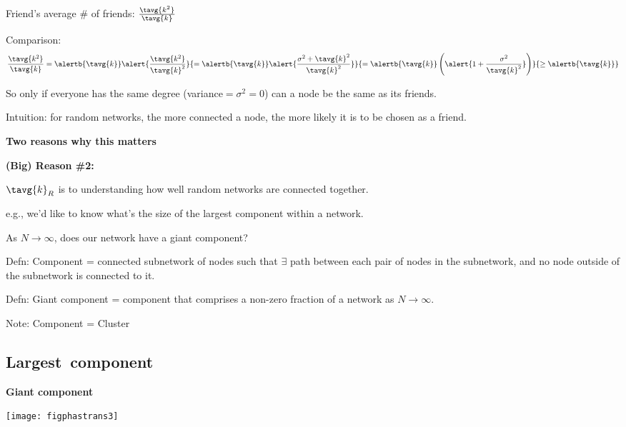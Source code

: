 \begin{frame}[label=]
\begin{frame}[label=]
\begin{frame}[label=]
\begin{frame}[label=]
\begin{frame}[label=]
\begin{frame}[label=]
\begin{frame}[label=]
\begin{frame}[label=]
\begin{frame}[label=]
\begin{frame}[label=]
\begin{frame}[label=]
\begin{frame}[label=]
\begin{frame}[label=]
\begin{frame}[label=]
\begin{frame}[label=]
\begin{frame}[label=]
\begin{frame}[label=]
\begin{frame}[label=]
\begin{frame}[label=]
      Friend's average \# of friends: $\frac{\tavg{k^2}}{\tavg{k}}$
    
      Comparison:
      $$
      \frac{\tavg{k^2}}{\tavg{k}}
      = \alertb{\tavg{k}} \alert{\frac{\tavg{k^2}}{\tavg{k}^2}}
      {
        = \alertb{\tavg{k}} \alert{\frac{\sigma^2 + \tavg{k}^2}{\tavg{k}^2}}
      }
      {
        = \alertb{\tavg{k}} 
        \left(
          \alert{1 + \frac{\sigma^2}{\tavg{k}^2}}
        \right)
      }
      {
        \ge \alertb{\tavg{k}}
      }
      $$
    
      So only if everyone has the same degree (variance$ = \sigma^2=0$)
      can a node be the same as its friends.
    
      Intuition: for random networks,
      the more connected a node, the more likely it is to be chosen
      as a friend.
    
  
  

\begin{frame}[label=]
  \textbf{Two reasons why this matters}
  
  \textbf{(Big) Reason \#2:}
    
     
      $\tavg{k}_R$ is  to understanding
      how well random networks are connected together.
     
      e.g., we'd like to know what's the 
      size of the largest component within a network.
     
      As $N \rightarrow \infty$, does 
      our network have a \alert{giant component}?
     
      \alert{Defn:}
      Component = connected subnetwork of nodes
      such that $\exists$ path between each
      pair of nodes in the subnetwork, and no
      node outside of the subnetwork is connected to it.
     
      \alert{Defn:}
      Giant component = component that comprises
      a non-zero fraction of a network as $N \rightarrow \infty$.
     
      Note: Component = Cluster
    
    
  
  

\subsection{Largest\ component}

\begin{frame}[label=]
  \textbf{Giant component}

  \texttt{[image: figphastrans3]}



\end{frame}
\end{frame}
\end{frame}
\end{frame}
\end{frame}
\end{frame}
\end{frame}
\end{frame}
\end{frame}
\end{frame}
\end{frame}
\end{frame}
\end{frame}
\end{frame}
\end{frame}
\end{frame}
\end{frame}
\end{frame}
\end{frame}
\end{frame}
\end{frame}
